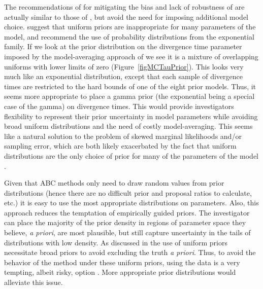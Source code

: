 The recommendations of \citet{Oaks2012} for mitigating the bias and lack of
robustness of \msb are actually similar to those of \citet{Hickerson2013}, but
avoid the need for imposing additional model choice.
\citet{Oaks2012} suggest that uniform priors are inappropriate for many
parameters of the \msb model, and recommend the use of probability
distributions from the exponential family.
If we look at the prior distribution on the divergence time parameter \divt{}
imposed by the model-averaging approach of \citet{Hickerson2013} we see
it is a mixture of overlapping uniforms with lower limits of zero
(Figure~\ref{figMCTauPrior}).
This looks very much like an exponential distribution, except that each sample
of divergence times are restricted to the hard bounds of one of the eight prior
models.
Thus, it seems more appropriate to place a gamma prior (the exponential being a
special case of the gamma) on divergence times.
This would provide investigators flexibility to represent their prior
uncertainty in model parameters while avoiding broad uniform
distributions and the need of costly model-averaging.
This seems like a natural solution to the problem of skewed marginal
likelihoods and/or sampling error, which are both likely exacerbated by the
fact that uniform distributions are the only choice of prior for many of the
parameters of the \msb model \citep[\divt{}, \ancestralTheta{},
, , \bottleTime{},
, , \locusRateHetShapeParameter,
\migrationRate{}, \recombinationRate;][]{Oaks2012}.

Given that ABC methods only need to draw random values from prior distributions
(hence there are no difficult prior and proposal ratios to calculate, etc.) it
is easy to use the most appropriate distributions on parameters.
Also, this approach reduces the temptation of empirically guided priors.
The investigator can place the majority of the prior density in regions of
parameter space they believe, \emph{a priori}, are most plausible, but still
capture uncertainty in the tails of distributions with low density.
As discussed in \citet{Oaks2012} the use of uniform priors necessitate
broad priors to avoid excluding the truth \emph{a priori}.
Thus, to avoid the behavior of the method under these uniform priors, using the
data is a very tempting, albeit risky, option \citep{Hickerson2013}.
More appropriate prior distributions would alleviate this issue.



